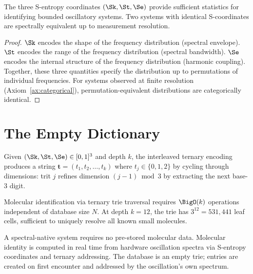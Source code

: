 \begin{theorem}
\label{thm:sufficiency}
The three S-entropy coordinates $(\Sk, \St, \Se)$ provide sufficient statistics for identifying bounded oscillatory systems. Two systems with identical S-coordinates are spectrally equivalent up to measurement resolution.
\end{theorem}

\begin{proof}
$\Sk$ encodes the shape of the frequency distribution (spectral envelope). $\St$ encodes the range of the frequency distribution (spectral bandwidth). $\Se$ encodes the internal structure of the frequency distribution (harmonic coupling). Together, these three quantities specify the distribution up to permutations of individual frequencies. For systems observed at finite resolution (Axiom~\ref{ax:categorical}), permutation-equivalent distributions are categorically identical.
\end{proof}

\section{The Empty Dictionary}
\label{sec:empty_dict}

\begin{definition}
\label{def:ternary}
Given $(\Sk, \St, \Se) \in [0,1]^3$ and depth $k$, the interleaved ternary encoding produces a string $\mathbf{t} = (t_1, t_2, \ldots, t_k)$ where $t_j \in \{0, 1, 2\}$ by cycling through dimensions: trit $j$ refines dimension $(j-1) \bmod 3$ by extracting the next base-3 digit.
\end{definition}

\begin{theorem}[O(k) Lookup]
\label{thm:lookup}
Molecular identification via ternary trie traversal requires $\BigO(k)$ operations independent of database size $N$. At depth $k = 12$, the trie has $3^{12} = 531{,}441$ leaf cells, sufficient to uniquely resolve all known small molecules.
\end{theorem}

\begin{definition}
\label{def:empty_dict}
A spectral-native system requires no pre-stored molecular data. Molecular identity is computed in real time from hardware oscillation spectra via S-entropy coordinates and ternary addressing. The database is an empty trie; entries are created on first encounter and addressed by the oscillation's own spectrum.
\end{definition}

